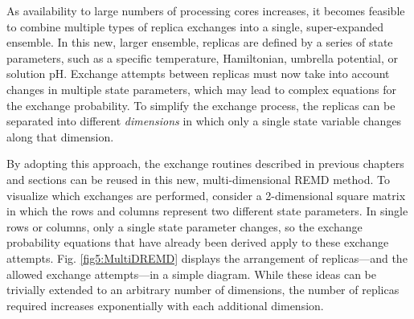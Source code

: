 As availability to large numbers of processing cores increases, it becomes
feasible to combine multiple types of replica exchanges into a single,
super-expanded ensemble. In this new, larger ensemble, replicas are defined by a
series of state parameters, such as a specific temperature, Hamiltonian,
umbrella potential, or solution pH. Exchange attempts between replicas must now
take into account changes in multiple state parameters, which may lead to
complex equations for the exchange probability. To simplify the exchange
process, the replicas can be separated into different \emph{dimensions} in which
only a single state variable changes along that dimension.

By adopting this approach, the exchange routines described in previous chapters
and sections can be reused in this new, multi-dimensional REMD method. To
visualize which exchanges are performed, consider a 2-dimensional square matrix
in which the rows and columns represent two different state parameters. In
single rows or columns, only a single state parameter changes, so the exchange
probability equations that have already been derived apply to these exchange
attempts. Fig. \ref{fig5:MultiDREMD} displays the arrangement of replicas---and
the allowed exchange attempts---in a simple diagram. While these ideas can be
trivially extended to an arbitrary number of dimensions, the number of replicas
required increases exponentially with each additional dimension.

